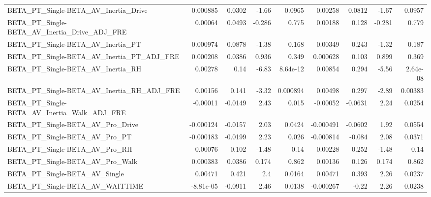 \begin{tabular}{lrrrrrrrr}
BETA\_PT\_Single-BETA\_AV\_Inertia\_Drive               &    0.000885 &       0.0302 &    -1.66 &   0.0965 &    0.00258 &      0.0812 &        -1.67 &        0.0957 \\
BETA\_PT\_Single-BETA\_AV\_Inertia\_Drive\_ADJ\_FRE       &     0.00064 &       0.0493 &   -0.286 &    0.775 &    0.00188 &       0.128 &       -0.281 &         0.779 \\
BETA\_PT\_Single-BETA\_AV\_Inertia\_PT                  &    0.000974 &       0.0878 &    -1.38 &    0.168 &    0.00349 &       0.243 &        -1.32 &         0.187 \\
BETA\_PT\_Single-BETA\_AV\_Inertia\_PT\_ADJ\_FRE          &    0.000208 &       0.0386 &    0.936 &    0.349 &   0.000628 &       0.103 &        0.899 &         0.369 \\
BETA\_PT\_Single-BETA\_AV\_Inertia\_RH                  &     0.00278 &         0.14 &    -6.83 & 8.64e-12 &    0.00854 &       0.294 &        -5.56 &      2.64e-08 \\
BETA\_PT\_Single-BETA\_AV\_Inertia\_RH\_ADJ\_FRE          &     0.00156 &        0.141 &    -3.32 & 0.000894 &    0.00498 &       0.297 &        -2.89 &       0.00383 \\
BETA\_PT\_Single-BETA\_AV\_Inertia\_Walk\_ADJ\_FRE        &    -0.00011 &      -0.0149 &     2.43 &    0.015 &   -0.00052 &     -0.0631 &         2.24 &        0.0254 \\
BETA\_PT\_Single-BETA\_AV\_Pro\_Drive                   &   -0.000124 &      -0.0157 &     2.03 &   0.0424 &  -0.000491 &     -0.0602 &         1.92 &        0.0554 \\
BETA\_PT\_Single-BETA\_AV\_Pro\_PT                      &   -0.000183 &      -0.0199 &     2.23 &    0.026 &  -0.000814 &      -0.084 &         2.08 &        0.0371 \\
BETA\_PT\_Single-BETA\_AV\_Pro\_RH                      &     0.00076 &        0.102 &    -1.48 &     0.14 &    0.00228 &       0.252 &        -1.48 &          0.14 \\
BETA\_PT\_Single-BETA\_AV\_Pro\_Walk                    &    0.000383 &       0.0386 &    0.174 &    0.862 &    0.00136 &       0.126 &        0.174 &         0.862 \\
BETA\_PT\_Single-BETA\_AV\_Single                      &     0.00471 &        0.421 &      2.4 &   0.0164 &    0.00471 &       0.393 &         2.26 &        0.0237 \\
BETA\_PT\_Single-BETA\_AV\_WAITTIME                    &   -8.81e-05 &      -0.0911 &     2.46 &   0.0138 &  -0.000267 &       -0.22 &         2.26 &        0.0238 \\

\end{tabular}
